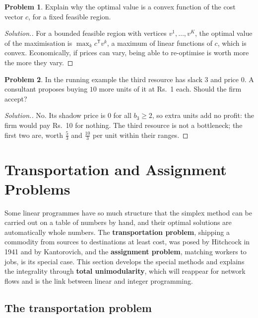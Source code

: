 \documentclass[11pt,a4paper]{article}
\numberwithin{equation}{section}
\theoremstyle{definition}
\newtheorem{problemx}{Problem}[subsection]
\newenvironment{problem}{\begin{problemx}}{\end{problemx}}
\newenvironment{solution}
  {\renewcommand{\qedsymbol}{}\begin{proof}[\textit{Solution}.]}
  {\end{proof}}
\begin{document}
\begin{problem}
Explain why the optimal value is a convex function of the cost vector $c$, for a fixed feasible region.
\end{problem}

\begin{solution}
For a bounded feasible region with vertices $v^1, \ldots, v^K$, the optimal value of the maximisation is $\max_kc^{\mathsf T}v^k$, a maximum of linear functions of $c$, which is convex. Economically, if prices can vary, being able to re-optimise is worth more the more they vary.
\end{solution}

\begin{problem}
In the running example the third resource has slack $3$ and price $0$. A consultant proposes buying $10$ more units of it at Rs.~1 each. Should the firm accept?
\end{problem}

\begin{solution}
No. Its shadow price is $0$ for all $b_3 \geq 2$, so extra units add no profit: the firm would pay Rs.~10 for nothing. The third resource is not a bottleneck; the first two are, worth $\frac53$ and $\frac{10}3$ per unit within their ranges.
\end{solution}

\section{Transportation and Assignment Problems}
\label{sec:transportation}

Some linear programmes have so much structure that the simplex method can be carried out on a table of numbers by hand, and their optimal solutions are automatically whole numbers. The \textbf{transportation problem}, shipping a commodity from sources to destinations at least cost, was posed by Hitchcock in 1941 and by
Kantorovich, and the \textbf{assignment problem}, matching workers to jobs, is its special case. This section develops the special methods and explains the integrality through \textbf{total unimodularity}, which will reappear for network flows and is the link between linear and integer programming.

\subsection{The transportation problem}
\label{ssec:transport}
\end{document}
